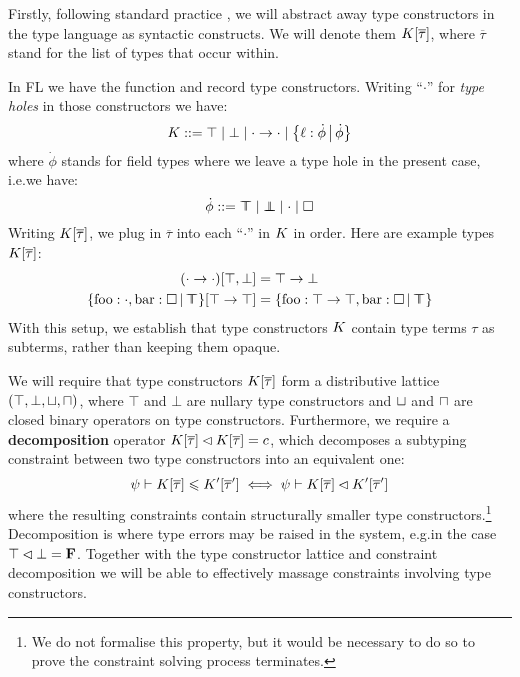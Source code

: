 Firstly, following standard practice \cite{essence-of-ml-type-inference, constraint-based-freeze-ml},  we will abstract away type constructors in the type language as syntactic constructs. We will denote them $K[\overline \tau]$, where $\overline \tau$ stand for the list of types that occur within.
\begin{example}
    In FL we have the function and record type constructors. Writing \enquote{$\cdot$} for \emph{type holes} in those constructors we have:
    $$ \constr ::= \top \mid \bot \mid {\cdot} \to {\cdot} \mid \flext{\ell : \dot \phi}{\dot \phi} $$
    where $\dot \phi$ stands for field types where we leave a type hole in the present case, i.e.\@ we have:
    $$ \dot \phi ::= \flftop \mid \flfbot \mid \cdot \mid \flabsent $$
    Writing $K[\overline \tau]$, we plug in $\overline \tau$ into each \enquote{$\cdot$} in $K$ in order. Here are example types $K[\overline \tau]$:
    \begin{align*}  
        (\cdot \to \cdot)[\top, \bot] &= \top \to \bot \\
        \flext{\mathrm{foo}: \cdot, \mathrm{bar} : \flabsent}{\flftop}[\top \to \top] &= \flext{\mathrm{foo}: \top \to \top, \mathrm{bar} : \flabsent}{\flftop}
    \end{align*}
    With this setup, we establish that type constructors $K$ contain type terms $\tau$ as subterms, rather than keeping them opaque. 
\end{example}
We will require that type constructors $K[\overline \tau]$ form a distributive lattice $(\top, \bot, \sqcup, \sqcap)$, where $\top$ and $\bot$ are nullary type constructors and $\sqcup$ and $\sqcap$ are closed binary operators on type constructors. Furthermore, we require a \textbf{decomposition} operator $K[\overline \tau] \lhd K[\overline \tau] = c$, which decomposes a subtyping constraint between two type constructors into an equivalent one:
$$ \psi \vdash K[\overline \tau] \leqslant K'[\overline \tau'] \iff \psi \vdash K[\overline \tau] \lhd K'[\overline \tau'] $$
where the resulting constraints contain structurally smaller type constructors.\footnote{We do not formalise this property, but it would be necessary to do so to prove the constraint solving process terminates.} Decomposition is where type errors may be raised in the system, e.g.\@ in the case $\top \lhd \bot = \mathbf F$. Together with the type constructor lattice and constraint decomposition we will be able to effectively massage constraints involving type constructors. 
